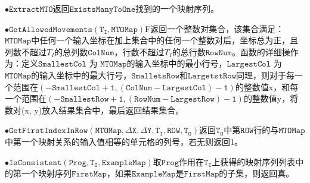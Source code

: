 \documentclass[design, pageheader]{njubachelor}
\begin{document}
$\bullet \mathtt{ExtractMTO}$返回$\mathtt{ExistsManyToOne}$找到的一个映射序列。

$\bullet \mathtt{GetAllowedMovements(T_{I}, MTOMap)}$F返回一个整数对集合，该集合满足：$\mathtt{MTOMap}$中任何一个输入坐标在加上集合中的任何一个整数对后，坐标总为正，且列数不超过$T_{I}$的总列数$\mathtt{ColNum}$，行数不超过$T_{I}$的总行数$\mathtt{RowNum}$。函数的详细操作为：定义$\mathtt{SmallestCol}$ 为 $\mathtt{MTOMap}$的输入坐标中的最小行号，$\mathtt{LargestCol}$ 为 $\mathtt{MTOMap}$的输入坐标中的最大行号，$\mathtt{SmalletsRow}$和$\mathtt{LargetstRow}$同理，则对于每一个范围在$\mathtt{(-SmallestCol + 1, (ColNum - LargestCol) - 1)}$的整数值x，和每一个范围在$\mathtt{(-SmallestRow + 1, (RowNum - LargestRow) - 1)}$的整数值y，将数对(x, y)放入结果集合中，最后返回结果集合。

$\bullet \mathtt{GetFirstIndexInRow(MTOMap, \Delta X, \Delta Y, T_{I}, ROW, T_{O})}$返回$\mathtt{T_{O}}$中第$\mathtt{ROW}$行的与$\mathtt{MTOMap}$中第一个映射关系的输入值相等的单元格的列号，若无则返回1。

$\bullet \mathtt{IsConsistent(Prog, T_{I}, ExampleMap)}$取$\mathtt{Prog}$作用在$\mathtt{T_{I}}$上获得的映射序列列表中的第一个映射序列$\mathtt{FirstMap}$，如果$\mathtt{ExampleMap}$是$\mathtt{FirstMap}$的子集，则返回真。
\end{document}
